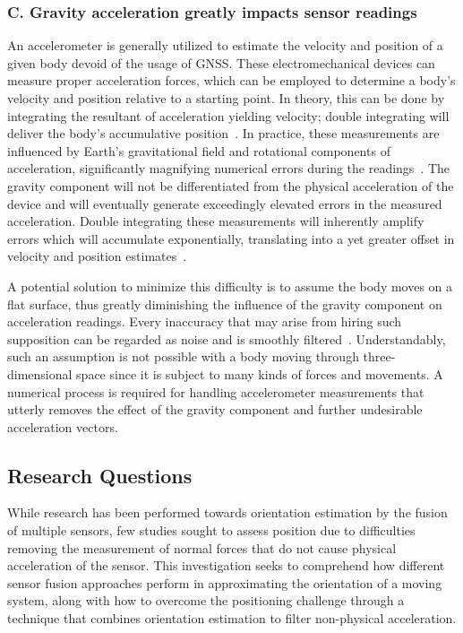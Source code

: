\subsubsection{C. Gravity acceleration greatly impacts sensor readings}
An accelerometer is generally utilized to estimate the velocity and position of a given body devoid of the usage of GNSS. These electromechanical devices can measure proper acceleration forces, which can be employed to determine a body's velocity and position relative to a starting point. In theory, this can be done by integrating the resultant of acceleration yielding velocity; double integrating will deliver the body's accumulative position~\cite{yang2006simple}. In practice, these measurements are influenced by Earth's gravitational field and rotational components of acceleration, significantly magnifying numerical errors during the readings~\cite{nistler2011gravity}. The gravity component will not be differentiated from the physical acceleration of the device and will eventually generate exceedingly elevated errors in the measured acceleration. Double integrating these measurements will inherently amplify errors which will accumulate exponentially, translating into a yet greater offset in velocity and position estimates~\cite{thong2004numerical}.

A potential solution to minimize this difficulty is to assume the body moves on a flat surface, thus greatly diminishing the influence of the gravity component on acceleration readings. Every inaccuracy that may arise from hiring such supposition can be regarded as noise and is smoothly filtered~\cite{nistler2011gravity}. Understandably, such an assumption is not possible with a body moving through three-dimensional space since it is subject to many kinds of forces and movements.  A numerical process is required for handling accelerometer measurements that utterly removes the effect of the gravity component and further undesirable acceleration vectors.






\subsection{Research Questions}
While research has been performed towards orientation estimation by the fusion of multiple sensors, few studies sought to assess position due to difficulties removing the measurement of normal forces that do not cause physical acceleration of the sensor. This investigation seeks to comprehend how different sensor fusion approaches perform in approximating the orientation of a moving system, along with how to overcome the positioning challenge through a technique that combines orientation estimation to filter non-physical acceleration.

